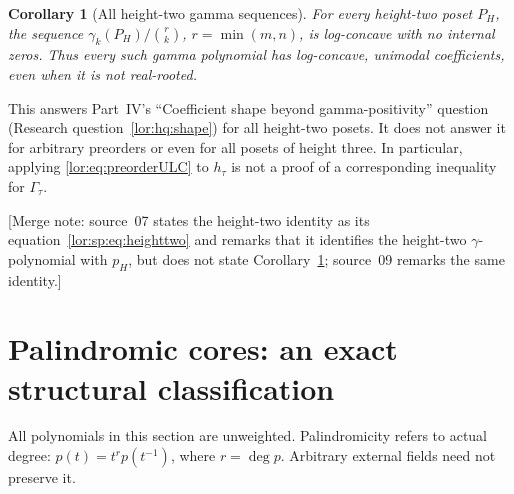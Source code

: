 \documentclass[11pt]{article}
\numberwithin{equation}{section}
\newtheorem{corollary}[theorem]{Corollary}
\theoremstyle{definition}
\begin{document}
\begin{corollary}[All height-two gamma sequences]\label{lor:cor:gammaULC}
For every height-two poset $P_H$, the sequence
$\gamma_k(P_H)/\binom r k$, $r=\min(m,n)$, is log-concave with no internal
zeros. Thus every such gamma polynomial has log-concave, unimodal
coefficients, even when it is not real-rooted.
\end{corollary}
This answers Part~IV's ``Coefficient shape beyond gamma-positivity''
question (Research question~\ref{lor:hq:shape}) for all height-two posets. It does not answer it for arbitrary
preorders or even for all posets of height three. In particular, applying
\eqref{lor:eq:preorderULC} to $h_\tau$ is not a proof of a corresponding
inequality for $\Gamma_\tau$.

[Merge note: source~07 states the height-two identity as its
equation~\eqref{lor:sp:eq:heighttwo} and remarks that it identifies the
height-two $\gamma$-polynomial with $p_H$, but does not state
Corollary~\ref{lor:cor:gammaULC}; source~09 remarks the same identity.]

\section{Palindromic cores: an exact structural classification}
\label{lor:sp:sec:pal}

All polynomials in this section are unweighted. Palindromicity refers to actual
degree: $p(t)=t^r p(t^{-1})$, where $r=\deg p$. Arbitrary external fields
need not preserve it.
\end{document}
